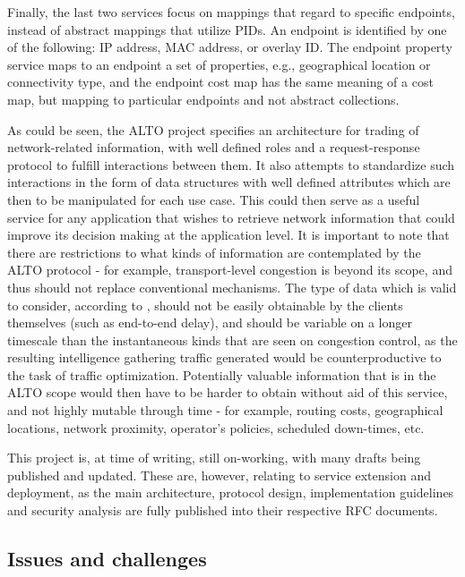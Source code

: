     Finally, the last two services focus on mappings that regard to specific endpoints, instead of abstract mappings that utilize PIDs.
    An endpoint is identified by one of the following: IP address, MAC address, or overlay ID.
    The endpoint property service maps to an endpoint a set of properties, e.g., geographical location or connectivity type, and the endpoint cost map has the same meaning of a cost map, but mapping to particular endpoints and not abstract collections.


    As could be seen, the ALTO project specifies an architecture for trading of network-related information, with well defined roles and a request-response protocol to fulfill interactions between them.
    It also attempts to standardize such interactions in the form of data structures with well defined attributes which are then to be manipulated for each use case.
    This could then serve as a useful service for any application that wishes to retrieve network information that could improve its decision making at the application level.
    It is important to note that there are restrictions to what kinds of information are contemplated by the ALTO protocol - for example, transport-level congestion is beyond its scope, and thus should not replace conventional mechanisms.
    The type of data which is valid to consider, according to \cite{alto-protocol}, should not be easily obtainable by the clients themselves (such as end-to-end delay), and should be variable on a longer timescale than the instantaneous kinds that are seen on congestion control, as the resulting intelligence gathering traffic generated would be counterproductive to the task of traffic optimization.
    Potentially valuable information that is in the ALTO scope would then have to be harder to obtain without aid of this service, and not highly mutable through time - for example, routing costs, geographical locations, network proximity, operator's policies, scheduled down-times, etc.

    This project is, at time of writing, still on-working, with many drafts being published and updated.
    These are, however, relating to service extension and deployment, as the main architecture, protocol design, implementation guidelines and security analysis are fully published into their respective RFC documents.

\subsection{Issues and challenges}

